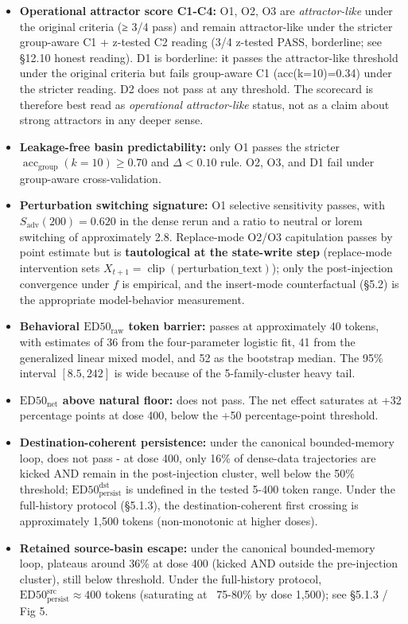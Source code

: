 \documentclass{article}
\theoremstyle{plain}
\theoremstyle{definition}
\begin{document}
\begin{itemize}
  \item \textbf{Operational attractor score C1-C4:} O1, O2, O3 are \textit{attractor-like} under the original criteria (≥ 3/4 pass) and remain attractor-like under the stricter group-aware C1 + z-tested C2 reading (3/4 z-tested PASS, borderline; see §12.10 honest reading). D1 is borderline: it passes the attractor-like threshold under the original criteria but fails group-aware C1 (acc(k=10)=0.34) under the stricter reading. D2 does not pass at any threshold. The scorecard is therefore best read as \textit{operational attractor-like} status, not as a claim about strong attractors in any deeper sense.
  \item \textbf{Leakage-free basin predictability:} only O1 passes the stricter \(\operatorname{acc}_{\mathrm{group}}(k=10)\geq0.70\) and \(\Delta<0.10\) rule. O2, O3, and D1 fail under group-aware cross-validation.
  \item \textbf{Perturbation switching signature:} O1 selective sensitivity passes, with \(S_{\mathrm{adv}}(200)=0.620\) in the dense rerun and a ratio to neutral or lorem switching of approximately 2.8. Replace-mode O2/O3 capitulation passes by point estimate but is \textbf{tautological at the state-write step} (replace-mode intervention sets \(X_{t+1}=\operatorname{clip}(\text{perturbation\_text})\)); only the post-injection convergence under \(f\) is empirical, and the insert-mode counterfactual (§5.2) is the appropriate model-behavior measurement.
  \item \textbf{Behavioral \(\mathrm{ED50}_{\mathrm{raw}}\) token barrier:} passes at approximately 40 tokens, with estimates of 36 from the four-parameter logistic fit, 41 from the generalized linear mixed model, and 52 as the bootstrap median. The 95\% interval \([8.5,242]\) is wide because of the 5-family-cluster heavy tail.
  \item \textbf{\(\mathrm{ED50}_{\mathrm{net}}\) above natural floor:} does not pass. The net effect saturates at +32 percentage points at dose 400, below the +50 percentage-point threshold.
  \item \textbf{Destination-coherent persistence:} under the canonical bounded-memory loop, does not pass - at dose 400, only 16\% of dense-data trajectories are kicked AND remain in the post-injection cluster, well below the 50\% threshold; \(\mathrm{ED50}_{\mathrm{persist}}^{\mathrm{dst}}\) is undefined in the tested 5-400 token range. Under the full-history protocol (§5.1.3), the destination-coherent first crossing is approximately 1,500 tokens (non-monotonic at higher doses).
  \item \textbf{Retained source-basin escape:} under the canonical bounded-memory loop, plateaus around 36\% at dose 400 (kicked AND outside the pre-injection cluster), still below threshold. Under the full-history protocol, \(\mathrm{ED50}_{\mathrm{persist}}^{\mathrm{src}}\approx 400\) tokens (saturating at ~75-80\% by dose 1,500); see §5.1.3 / Fig 5.
\end{itemize}
\end{document}
